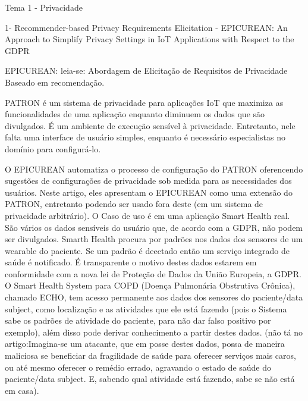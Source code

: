 
Tema 1 - Privacidade

1- Recommender-based Privacy Requirements Elicitation - EPICUREAN: An Approach to Simplify Privacy Settings in IoT Applications with Respect to the GDPR

EPICUREAN: leia-se: Abordagem de Elicitação de Requisitos de Privacidade Baseado em recomendação.

PATRON é um sistema de privacidade para aplicações IoT que maximiza as funcionalidades de uma aplicação enquanto diminuem os dados que são divulgados. É um ambiente de execução sensível à privacidade. Entretanto, nele falta uma interface de usuário simples, enquanto é necessário especialistas no domínio para configurá-lo.

O EPICUREAN automatiza o processo de configuração do PATRON oferencendo sugestões de configurações de privacidade sob medida para as necessidades dos usuários.
Neste artigo, eles apresentam o EPICUREAN como uma extensão do PATRON, entretanto podendo ser usado fora deste (em um sistema de privacidade arbitrário). O Caso de uso é em uma aplicação Smart Health real. São vários os dados sensíveis do usuário que, de acordo com a GDPR, não podem ser divulgados. Smarth Health procura por padrões nos dados dos sensores de um wearable do paciente. Se um padrão é deectado então um serviço integrado de saúde é notificado. É transparente o motivo destes dados estarem em conformidade com a nova lei de Proteção de Dados da União Europeia, a GDPR. O Smart Health System para COPD (Doença Pulmonária Obstrutiva Crônica), chamado ECHO, tem acesso permanente aos dados dos sensores do paciente/data subject, como localização e as atividades que ele está fazendo (pois o Sistema sabe os padrões de atividade do paciente, para não dar falso positivo por exemplo), além disso pode derivar conhecimento a partir destes dados. (não tá no artigo:Imagina-se um atacante, que em posse destes dados, possa de maneira maliciosa se beneficiar da fragilidade de saúde para oferecer serviços mais caros, ou até mesmo oferecer o remédio errado, agravando o estado de saúde do paciente/data subject. E, sabendo qual atividade está fazendo, sabe se não está em casa).

